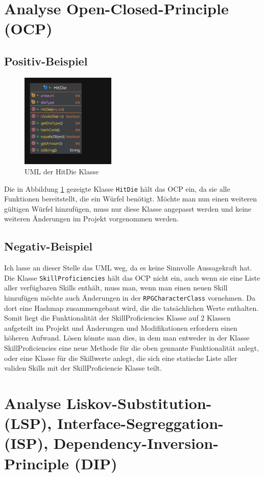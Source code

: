 \section{Analyse Open-Closed-Principle (OCP)}
\subsection{Positiv-Beispiel}
\begin{figure}[H]
	\centering
	\includegraphics[width=0.4\textwidth]{Bilder/HitDie.pdf}
	\caption{UML der HitDie Klasse}
	\label{fig:HitDie-OCP}
\end{figure}
Die in Abbildung \ref{fig:HitDie-OCP} gezeigte Klasse \texttt{HitDie} hält das OCP ein, da sie alle Funktionen bereitstellt, die ein Würfel benötigt. Möchte man nun einen weiteren gültigen Würfel hinzufügen, muss nur diese Klasse angepasst werden und keine weiteren Änderungen im Projekt vorgenommen werden.
\subsection{Negativ-Beispiel}
Ich lasse an dieser Stelle das UML weg, da es keine Sinnvolle Aussagekraft hat. Die Klasse \texttt{SkillProficiencies} hält das OCP nicht ein, auch wenn sie eine Liste aller verfügbaren Skills enthält, muss man, wenn man einen neuen Skill hinzufügen möchte auch Änderungen in der \texttt{RPGCharacterClass} vornehmen. Da dort eine Hashmap zusammengebaut wird, die die tatsächlichen Werte enthalten. Somit liegt die Funktionalität der SkillProficiencies Klasse auf 2 Klassen aufgeteilt im Projekt und Änderungen und Modifikationen erfordern einen höheren Aufwand. Lösen könnte man dies, in dem man entweder in der Klasse SkillProficiencies eine neue Methode für die oben gennante Funktionalität anlegt, oder eine Klasse für die Skillwerte anlegt, die sich eine statische Liste aller validen Skills mit der SkillProficiencie Klasse teilt.

\section{Analyse Liskov-Substitution- (LSP), Interface-Segreggation- (ISP), Dependency-Inversion-Principle (DIP)}
